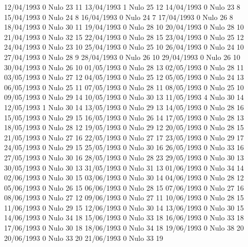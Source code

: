 12/04/1993  0     Nulo    23     11 
13/04/1993  1     Nulo    25     12 
14/04/1993  0     Nulo    23     8 
15/04/1993  0     Nulo    24     8 
16/04/1993  0     Nulo    24     7 
17/04/1993  0     Nulo    26     8 
18/04/1993  0     Nulo    30     11 
19/04/1993  0     Nulo    28     10 
20/04/1993  0     Nulo    28     10 
21/04/1993  0     Nulo    32     15 
22/04/1993  0     Nulo    28     15 
23/04/1993  0     Nulo    25     12 
24/04/1993  0     Nulo    23     10 
25/04/1993  0     Nulo    25     10 
26/04/1993  0     Nulo    24     10 
27/04/1993  0     Nulo    28     9 
28/04/1993  0     Nulo    26     10 
29/04/1993  0     Nulo    26     10 
30/04/1993  0     Nulo    26     10 
01/05/1993  0     Nulo    28     13 
02/05/1993  0     Nulo    28     11 
03/05/1993  0     Nulo    27     12 
04/05/1993  0     Nulo    25     12 
05/05/1993  0     Nulo    24     13 
06/05/1993  0     Nulo    25     11 
07/05/1993  0     Nulo    28     11 
08/05/1993  0     Nulo    25     10 
09/05/1993  0     Nulo    29     14 
10/05/1993  0     Nulo    30     13 
11/05/1993  4     Nulo    30     14 
12/05/1993  1     Nulo    30     14 
13/05/1993  0     Nulo    29     13 
14/05/1993  0     Nulo    28     16 
15/05/1993  0     Nulo    29     15 
16/05/1993  0     Nulo    26     14 
17/05/1993  0     Nulo    28     13 
18/05/1993  0     Nulo    28     12 
19/05/1993  0     Nulo    29     12 
20/05/1993  0     Nulo    28     15 
21/05/1993  0     Nulo    27     16 
22/05/1993  0     Nulo    27     17 
23/05/1993  0     Nulo    29     17 
24/05/1993  0     Nulo    29     15 
25/05/1993  0     Nulo    30     16 
26/05/1993  0     Nulo    33     16 
27/05/1993  0     Nulo    30     16 
28/05/1993  0     Nulo    28     23 
29/05/1993  0     Nulo    30     13 
30/05/1993  0     Nulo    30     13 
31/05/1993  0     Nulo    31     13 
01/06/1993  0     Nulo    34     14 
02/06/1993  0     Nulo    30     15 
03/06/1993  0     Nulo    30     14 
04/06/1993  0     Nulo    28     12 
05/06/1993  0     Nulo    26     15 
06/06/1993  0     Nulo    28     15 
07/06/1993  0     Nulo    27     16 
08/06/1993  0     Nulo    27     12 
09/06/1993  0     Nulo    27     11 
10/06/1993  0     Nulo    28     15 
11/06/1993  0     Nulo    29     15 
12/06/1993  0     Nulo    30     14 
13/06/1993  0     Nulo    30     15 
14/06/1993  0     Nulo    34     18 
15/06/1993  0     Nulo    33     18 
16/06/1993  0     Nulo    33     18 
17/06/1993  0     Nulo    30     18 
18/06/1993  0     Nulo    34     18 
19/06/1993  0     Nulo    38     20 
20/06/1993  0     Nulo    33     20 
21/06/1993  0     Nulo    33     19 
